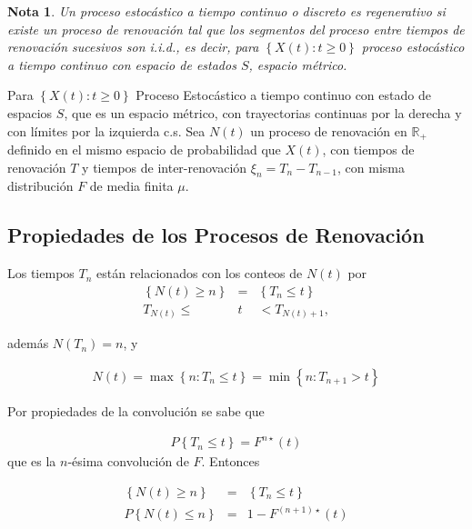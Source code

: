 \documentclass{article}
\newtheorem{Note}{Nota}[section]
\newcommand{\rea}{\mathbb{R}}
\numberwithin{equation}{section}
\begin{document}
\begin{Note}
Un proceso estoc\'astico a tiempo continuo o discreto es regenerativo si existe un proceso de renovaci\'on  tal que los segmentos del proceso entre tiempos de renovaci\'on sucesivos son i.i.d., es decir, para $\left\{X\left(t\right):t\geq0\right\}$ proceso estoc\'astico a tiempo continuo con espacio de estados $S$, espacio m\'etrico.
\end{Note}

Para $\left\{X\left(t\right):t\geq0\right\}$ Proceso Estoc\'astico a tiempo continuo con estado de espacios $S$, que es un espacio m\'etrico, con trayectorias continuas por la derecha y con l\'imites por la izquierda c.s. Sea $N\left(t\right)$ un proceso de renovaci\'on en $\rea_{+}$ definido en el mismo espacio de probabilidad que $X\left(t\right)$, con tiempos de renovaci\'on $T$ y tiempos de inter-renovaci\'on $\xi_{n}=T_{n}-T_{n-1}$, con misma distribuci\'on $F$ de media finita $\mu$.



\subsection*{Propiedades de los Procesos de Renovaci\'on}
Los tiempos $T_{n}$ est\'an relacionados con los conteos de $N\left(t\right)$ por
\begin{eqnarray*}
\left\{N\left(t\right)\geq n\right\}&=&\left\{T_{n}\leq t\right\}\\
T_{N\left(t\right)}\leq &t&<T_{N\left(t\right)+1},
\end{eqnarray*}

adem\'as $N\left(T_{n}\right)=n$, y 

\begin{eqnarray*}
N\left(t\right)=\max\left\{n:T_{n}\leq t\right\}=\min\left\{n:T_{n+1}>t\right\}
\end{eqnarray*}

Por propiedades de la convoluci\'on se sabe que

\begin{eqnarray*}
P\left\{T_{n}\leq t\right\}=F^{n\star}\left(t\right)
\end{eqnarray*}
que es la $n$-\'esima convoluci\'on de $F$. Entonces 

\begin{eqnarray*}
\left\{N\left(t\right)\geq n\right\}&=&\left\{T_{n}\leq t\right\}\\
P\left\{N\left(t\right)\leq n\right\}&=&1-F^{\left(n+1\right)\star}\left(t\right)
\end{eqnarray*}
\end{document}
